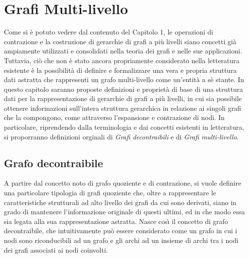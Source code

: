\chapter{Grafi Multi-livello}

Come si \`e potuto vedere dal contenuto del Capitolo 1, le operazioni di contrazione e la costruzione di
gerarchie di grafi a pi\`u livelli siano concetti gi\`a ampiamente utilizzati e consolidati nella teoria dei grafi e
nelle sue applicazioni.
Tuttavia, ci\`o che non \`e stato ancora propriamente considerato nella letteratura esistente \`e la possibilit\`a di
definire e formalizzare una vera e propria struttura dati astratta che rappresenti un grafo multi-livello come
un'entit\`a a s\`e stante.
In questo capitolo saranno proposte definizioni e propriet\`a di base di una struttura dati per la rappresentazione
di gerarchie di grafi a pi\`u livelli, in cui sia possibile ottenere informazioni sull'intera struttura gerarchica in
relazione ai singoli grafi che la compongono, come attraverso l'espansione e contrazione di nodi.
In particolare, riprendendo dalla terminologia e dai concetti esistenti in letteratura, si proporranno definizioni
orginali di \textit{Grafi decontraibili} e di \textit{Grafi multi-livello}.

\section{Grafo decontraibile}\label{subsec:grafo-decontraibile}

    A partire dal concetto noto di grafo quoziente e di contrazione, si vuole definire una particolare
    tipologia di grafi quoziente che, oltre a rappresentare le caratteristiche strutturali ad alto livello
    dei grafi da cui sono derivati, siano in grado di mantenere l'informazione originale di questi ultimi, ed in
    che modo essa sia legata alla sua rappresentazione astratta. \newline
    Nasce cos\`{\i} il concetto di grafo decontraibile, che intuitivamente pu\`o essere considerato come un grafo
    in cui i nodi sono riconducibili ad un grafo e gli archi ad un insieme di archi tra i nodi dei grafi
    associati ai nodi coinvolti. \newline

